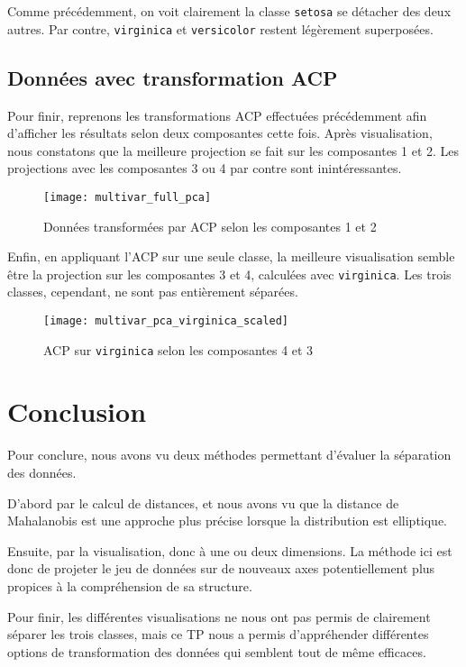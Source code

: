 \documentclass[french]{report}
\begin{document}
    Comme précédemment, on voit clairement la classe \texttt{setosa} se détacher des deux autres.
    Par contre, \texttt{virginica} et \texttt{versicolor} restent légèrement superposées.
    
    \section{Données avec transformation ACP}
    
    Pour finir, reprenons les transformations ACP effectuées précédemment afin d'afficher les résultats selon deux composantes cette fois.
    Après visualisation, nous constatons que la meilleure projection se fait sur les composantes 1 et 2.
    Les projections avec les composantes 3 ou 4 par contre sont inintéressantes.
    \newpage
    \begin{figure}[h]
        \centering
        \texttt{[image: multivar\_full\_pca]}
        \caption{Données transformées par ACP selon les composantes 1 et 2}
    \end{figure}
    \leavevmode
    
    Enfin, en appliquant l'ACP sur une seule classe, la meilleure visualisation semble être la projection sur les composantes 3 et 4, calculées avec \texttt{virginica}.
    Les trois classes, cependant, ne sont pas entièrement séparées.
    
    \begin{figure}[!h]
        \centering
        \texttt{[image: multivar\_pca\_virginica\_scaled]}
        \caption{ACP sur \texttt{virginica} selon les composantes 4 et 3}
    \end{figure}
    
    \chapter*{Conclusion}
    
    Pour conclure, nous avons vu deux méthodes permettant d'évaluer la séparation des données.
    
    D'abord par le calcul de distances, et nous avons vu que la distance de Mahalanobis est une approche plus précise lorsque la distribution est elliptique.
    
    Ensuite, par la visualisation, donc à une ou deux dimensions.
    La méthode ici est donc de projeter le jeu de données sur de nouveaux axes potentiellement plus propices à la compréhension de sa structure.
    
    Pour finir, les différentes visualisations ne nous ont pas permis de clairement séparer les trois classes, mais ce TP nous a permis d'appréhender différentes options de transformation des données qui semblent tout de même efficaces.
\end{document}
